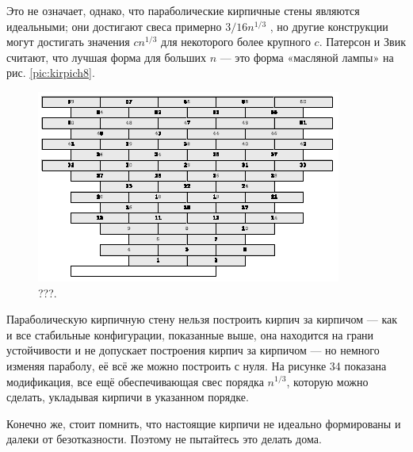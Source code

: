 Это не означает, однако, что параболические кирпичные стены являются идеальными; они достигают свеса примерно $3/16n^{1/3}$ , но другие конструкции могут достигать значения $cn^{1/3}$ для некоторого более крупного $c$.
Патерсон и Звик считают, что лучшая форма для больших $n$ --- это форма «масляной лампы» на рис. \ref{pic:kirpich8}.

\begin{figure}[htb!]
\centering
\includegraphics[scale=1]{pics/kirpich9}
\caption{???.}
\label{pic:kirpich9}
\end{figure}

Параболическую кирпичную стену нельзя построить кирпич за кирпичом — как и все стабильные конфигурации, показанные выше, она находится на грани устойчивости и не допускает построения кирпич за кирпичом — но немного изменяя параболу, её всё же можно построить с нуля. На рисунке 34 показана модификация, все ещё обеспечивающая свес порядка $n^{1/3}$, которую можно сделать, укладывая кирпичи в указанном порядке.

Конечно же, стоит помнить, что настоящие кирпичи не идеально формированы и далеки от безотказности.
Поэтому не пытайтесь это делать дома.
